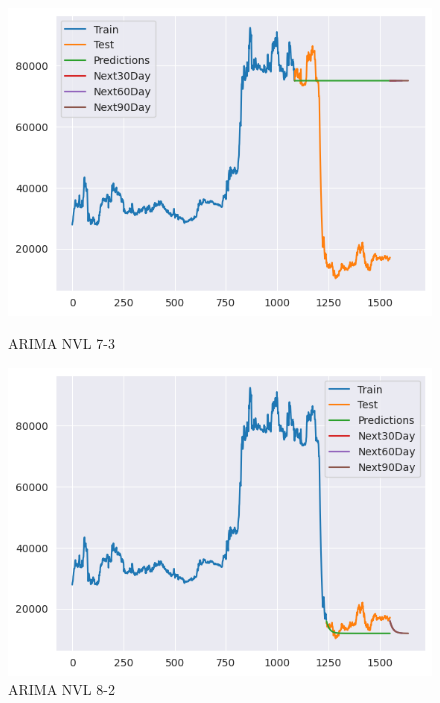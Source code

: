 \documentclass[conference]{IEEEtran}
\begin{document}
\begin{figure}[htbp]
    \begin{minipage}{0.23\textwidth}
    \centering
    \includegraphics[width=1\textwidth]{experiment/arima/NVL/7 _ 3/7_3_train_test_NVL_ARIMA_plot.png}
    \caption{ARIMA NVL 7-3}
    \label{fig:nvl_boxplot}
    \end{minipage}
    \hfill
    \begin{minipage}{0.23\textwidth}
    \centering
    \includegraphics[width=1\textwidth]{experiment/arima/NVL/8 _ 2/8_2_train_test_NVL_ARIMA_plot.png}
    \caption{ARIMA NVL 8-2}
    \label{fig:nvl_histogram}
    \end{minipage}
    \begin{minipage}{0.23\textwidth}
    \centering

\end{minipage}
\end{figure}
\end{document}
